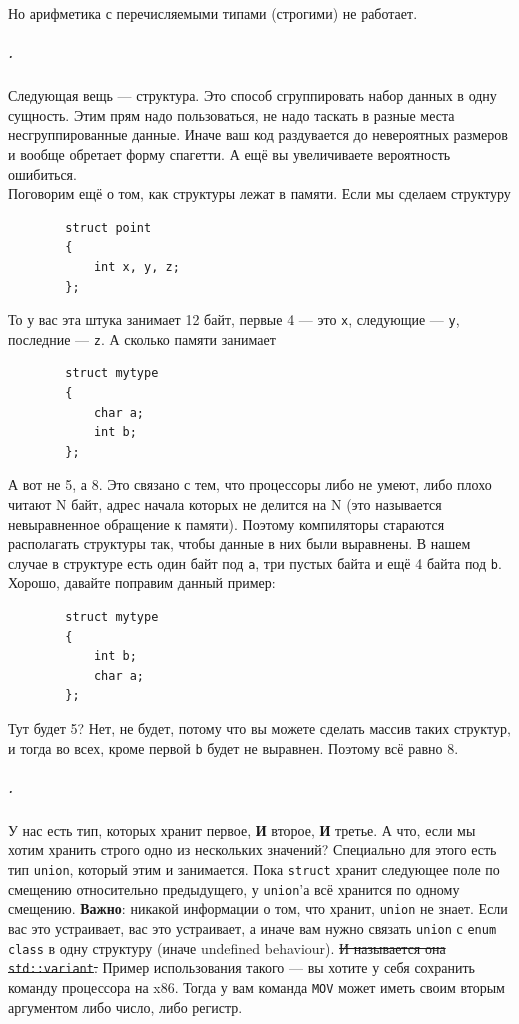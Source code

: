 \documentclass{article}
\newcommand{\asm}[1]{\texttt{#1}}
\begin{document}
    Но арифметика с перечисляемыми типами (строгими) не работает.
    \subparagraph{.}
    Следующая вещь --- структура. Это способ сгруппировать набор данных в одну сущность. Этим прям надо пользоваться, не надо таскать в разные места несгруппированные данные. Иначе ваш код раздувается до невероятных размеров и вообще обретает форму спагетти. А ещё вы увеличиваете вероятность ошибиться.\\
    Поговорим ещё о том, как структуры лежат в памяти. Если мы сделаем структуру
    \begin{verbatim}
        struct point
        {
            int x, y, z;
        };
    \end{verbatim}
    То у вас эта штука занимает 12 байт, первые 4 --- это \texttt{x}, следующие --- \texttt{y}, последние --- \texttt{z}. А сколько памяти занимает
    \begin{verbatim}
        struct mytype
        {
            char a;
            int b;
        };
    \end{verbatim}
    А вот не 5, а 8. Это связано с тем, что процессоры либо не умеют, либо плохо читают N байт, адрес начала которых не делится на N (это называется невыравненное обращение к памяти). Поэтому компиляторы стараются располагать структуры так, чтобы данные в них были выравнены. В нашем случае в структуре есть один байт под \texttt{a}, три пустых байта и ещё 4 байта под \texttt{b}. Хорошо, давайте поправим данный пример:
    \begin{verbatim}
        struct mytype
        {
            int b;
            char a;
        };
    \end{verbatim}
    Тут будет 5? Нет, не будет, потому что вы можете сделать массив таких структур, и тогда во всех, кроме первой \texttt{b} будет не выравнен. Поэтому всё равно 8.
    \subparagraph{.}
    У нас есть тип, которых хранит первое, \textbf{И} второе, \textbf{И} третье. А что, если мы хотим хранить строго одно из нескольких значений? Специально для этого есть тип \texttt{union}, который этим и занимается. Пока \texttt{struct} хранит следующее поле по смещению относительно предыдущего, у \texttt{union}'а всё хранится по одному смещению. \textbf{Важно}: никакой информации о том, что хранит, \texttt{union} не знает. Если вас это устраивает, вас это устраивает, а иначе вам нужно связать \texttt{union} с \texttt{enum class} в одну структуру (иначе undefined behaviour). \sout{И называется она \texttt{std::variant}.} Пример использования такого --- вы хотите у себя сохранить команду процессора на x86. Тогда у вам команда \asm{MOV} может иметь своим вторым аргументом либо число, либо регистр.
\end{document}
